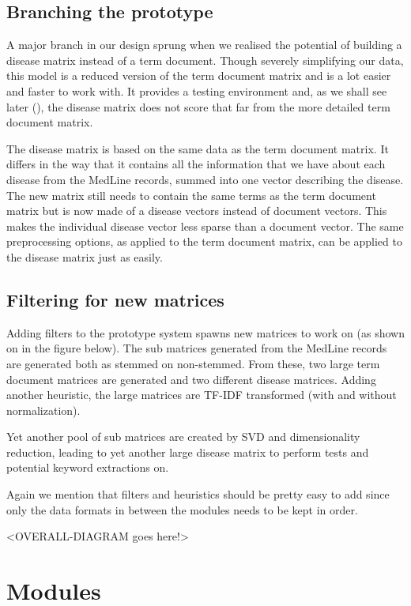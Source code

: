 \subsection{Branching the prototype\label{DiseaseMatrix}}

A major branch in our design sprung when we realised the potential of building a disease matrix instead of a term document. Though severely simplifying our data, this model is a reduced version of the term document matrix and is a lot easier and faster to work with. It provides a testing environment and, as we shall see later (), the disease matrix does not score that far from the more detailed term document matrix.

The disease matrix is based on the same data as the term document matrix. It differs in the way that it contains all the information that we have about each disease from the MedLine records, summed into one vector describing the disease. The new matrix still needs to contain the same terms as the term document matrix but is now made of a disease vectors instead of document vectors. This makes the individual disease vector less sparse than a document vector. The same preprocessing options, as applied to the term document matrix, can be applied to the disease matrix just as easily.

\subsection{Filtering for new matrices}

Adding filters to the prototype system spawns new matrices to work on
(as shown on in the figure below). The sub matrices generated from the
MedLine records are generated both as stemmed on non-stemmed. From
these, two large term document matrices are generated and two
different disease matrices. Adding another heuristic, the large
matrices are TF-IDF transformed (with and without normalization).

Yet another pool of sub matrices are created by SVD and dimensionality
reduction, leading to yet another large disease matrix to perform
tests and potential keyword extractions on.

Again we mention that filters and heuristics should be pretty easy to
add since only the data formats in between the modules needs to be
kept in order.

<OVERALL-DIAGRAM goes here!>

\section{Modules}

